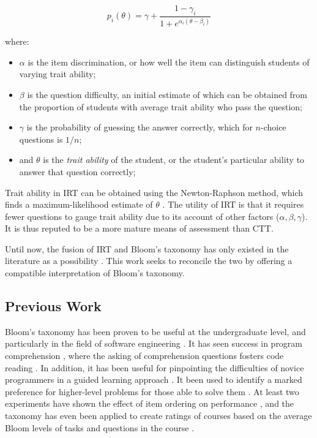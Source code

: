 \documentclass[a4paper,twocolumn]{article}
\begin{document}
\[
  p_i(\theta) = \gamma + \frac{1-\gamma_i}{1+e^{\alpha_i(\theta-\beta_i)}}
\]

where:

\begin{itemize} 

 \item $\alpha$ is the item discrimination, or how well the item can
 distinguish students of varying trait ability;

 \item $\beta$ is the question difficulty, an initial estimate of which can be
 obtained from the proportion of students with average trait ability who pass
 the question;

 \item $\gamma$ is the probability of guessing the answer correctly,
 which for $n$-choice questions is $1/n$;

 \item and $\theta$ is the \emph{trait ability} of the student, or the
 student's particular ability to answer that question correctly;

\end{itemize} 

Trait ability in IRT can be obtained using the Newton-Raphson method, which
finds a maximum-likelihood estimate of $\theta$ \cite{baker2004}.  The utility
of IRT is that it requires fewer questions to gauge trait ability due to its
account of other factors ($\alpha, \beta, \gamma$). It is thus reputed to be a
more mature means of assessment than CTT.

Until now, the fusion of IRT and Bloom's taxonomy has only existed in the
literature as a possibility \cite{sitthisak}.  This work seeks to reconcile
the two by offering a compatible interpretation of Bloom's taxonomy.

\subsection{Previous Work}

Bloom's taxonomy has been proven to be useful at the undergraduate level, and
particularly in the field of software engineering \cite{britto2015}
\cite{mahmood2014}.  It has seen success in program comprehension
\cite{buckley2003}, where the asking of comprehension questions fosters code
reading \cite{losada2008}. In addition, it has been useful for pinpointing the
difficulties of novice programmers in a guided learning approach
\cite{shuhidan2011}.  It been used to identify a marked preference for
higher-level problems for those able to solve them \cite{bruyn2011}
\cite{goel2004}.  At least two experiments have shown the effect of item
ordering on performance \cite{newman1988effect} \cite{castleberry2016effect},
and the taxonomy has even been applied to create ratings of courses based on
the average Bloom levels of tasks and questions in the course
\cite{oliver2004course}.
\end{document}
